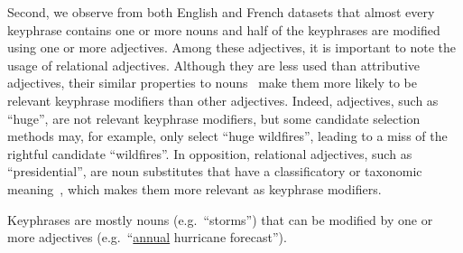     Second, we observe from both English and French datasets that almost every
    keyphrase contains one or more nouns and half of the keyphrases are modified
    using one or more adjectives.
    Among these adjectives, it is important to note the usage of relational
    adjectives. Although they are less used than attributive adjectives, their
    similar properties to
    nouns~\cite{bally1944linguistiquegeneraleetlinguistiquefrancaise} make them
    more likely to be relevant keyphrase modifiers than other adjectives.
    Indeed, adjectives, such as ``huge'', are not relevant keyphrase
    modifiers, but some candidate selection methods may, for example, only
    select ``huge wildfires'', leading to a miss of the rightful candidate
    ``wildfires''. In opposition, relational adjectives, such as
    ``presidential'', are noun substitutes that have a classificatory or
    taxonomic meaning~\cite{mcnally2004relationaladjectives}, which makes them
    more relevant as keyphrase modifiers.

    \begin{property}\label{prop:noun_phrases}
      Keyphrases are mostly nouns (e.g.~``storms'') that can be modified by one
      or more adjectives (e.g.~``\underline{annual} hurricane forecast'').
    \end{property}

